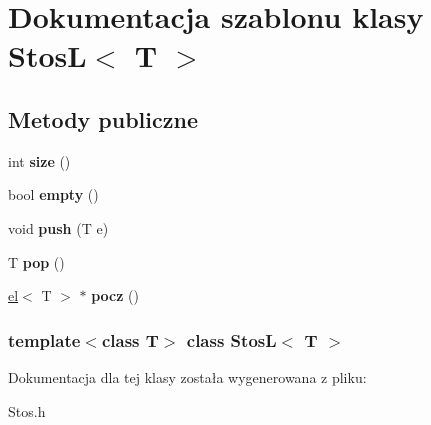\hypertarget{class_stos_l}{\section{\-Dokumentacja szablonu klasy \-Stos\-L$<$ \-T $>$}
\label{class_stos_l}
}
\subsection*{\-Metody publiczne}
\begin{DoxyCompactItemize}
\item 
\hypertarget{class_stos_l_aa33a51cb0ca3dbf005df8765586ce964}{int {\bfseries size} ()}\label{class_stos_l_aa33a51cb0ca3dbf005df8765586ce964}

\item 
\hypertarget{class_stos_l_a6ea23455139de8753792dc8682890055}{bool {\bfseries empty} ()}\label{class_stos_l_a6ea23455139de8753792dc8682890055}

\item 
\hypertarget{class_stos_l_af72c5941f1f181fc6b76570d978986d9}{void {\bfseries push} (\-T e)}\label{class_stos_l_af72c5941f1f181fc6b76570d978986d9}

\item 
\hypertarget{class_stos_l_a0430ba75c3c71ed85362cbbe8e8dc2bd}{\-T {\bfseries pop} ()}\label{class_stos_l_a0430ba75c3c71ed85362cbbe8e8dc2bd}

\item 
\hypertarget{class_stos_l_a48f686406573e0b16b3ab1e1ece8989b}{\hyperlink{classel}{el}$<$ \-T $>$ $\ast$ {\bfseries pocz} ()}\label{class_stos_l_a48f686406573e0b16b3ab1e1ece8989b}

\end{DoxyCompactItemize}
\subsubsection*{template$<$class T$>$ class Stos\-L$<$ T $>$}



\-Dokumentacja dla tej klasy została wygenerowana z pliku\-:\begin{DoxyCompactItemize}
\item 
\-Stos.\-h\end{DoxyCompactItemize}
